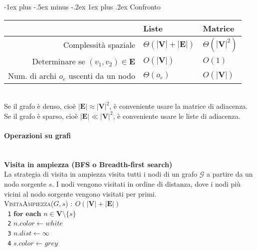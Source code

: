 \documentclass[10pt,landscape]{article}
\makeatletter
\renewcommand{\subsubsection}{\@startsection{subsubsection}{3}{0mm}%
                                {-1ex plus -.5ex minus -.2ex}%
                                {1ex plus .2ex}%
                                {\normalfont\normalsize\bfseries}}
\newcommand{\myparagraph}[1]{\paragraph{#1}\mbox{}\\ [5pt]}
\makeatother
\begin{document}
\begin{multicols*}{4}
                \subsubsection{Confronto}
                \renewcommand{\arraystretch}{1.3}%
                \begin{tabular}{r|l|l}
                                                                   & Liste                               & Matrice                  \\
                        \hline
                        Complessità spaziale                       & $\Theta(|\textbf{V}|+|\textbf{E}|)$ & $\Theta(|\textbf{V}|^2)$ \\
                        \hline
                        Determinare se $(v_1, v_2) \in \textbf{E}$ & $O(|\textbf{V}|)$                   & $O(1)$                   \\
                        \hline
                        Num. di archi $o_e$ uscenti da un nodo     & $\Theta(o_e)$                       & $O(|\textbf{V}|)$
                \end{tabular}\\ [5pt]
                Se il grafo è denso, cioè $|\textbf{E}| \approx |\textbf{V}|^2$, è conveniente usare la matrice di adiacenza. Se il grafo è sparso, cioè $|\textbf{E}| \ll |\textbf{V}|^2$, è conveniente usare le liste di adiacenza.
                \columnbreak
                \myparagraph{Operazioni su grafi}
                \textbf{Visita in ampiezza (BFS o Breadth-first search)}\\ [3pt]
                La strategia di visita in ampiezza visita tutti i nodi di un grafo $\mathcal{G}$ a partire da un nodo sorgente $s$. I nodi vengono visitati in ordine di distanza, dove i nodi più vicini al nodo sorgente vengono visitati per primi. \\ [5pt]
                \textsc{VisitaAmpiezza($G,s$)} $:\ O(|\textbf{V}|+|\textbf{E}|)$\\ [3pt]
                \verb| 1|\hspace*{0.5em} $\textbf{for each } n \in \textbf{V} \setminus \{s\}$\\
                \verb| 2|\hspace*{1.5em} $n.color \leftarrow white$\\
                \verb| 3|\hspace*{1.5em} $n.dist \leftarrow \infty$\\
                \verb| 4|\hspace*{0.5em} $s.color \leftarrow grey$\\

\end{multicols*}
\end{document}
